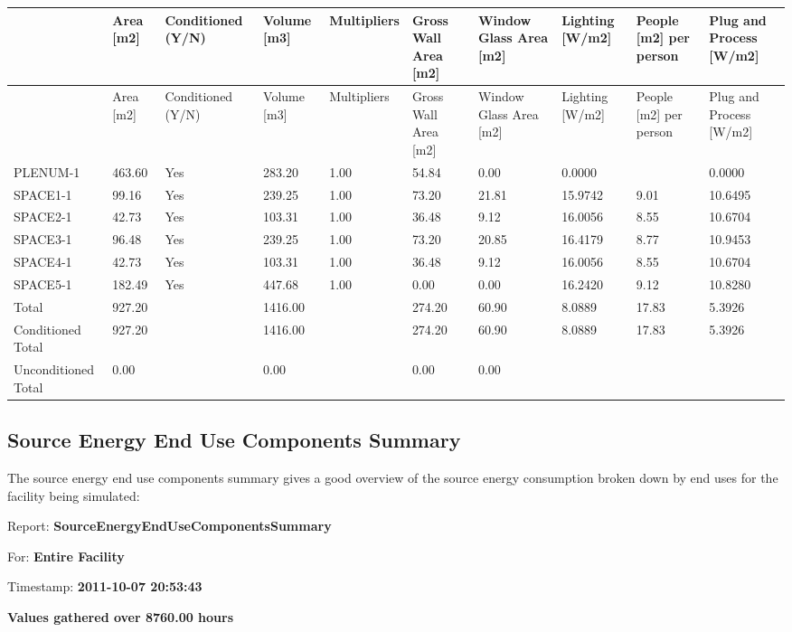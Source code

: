 {\scriptsize
\begin{longtable}[c]{>{\raggedright}p{0.7in}>{\raggedright}p{0.4in}>{\raggedright}p{0.5in}>{\raggedright}p{0.5in}>{\raggedright}p{0.4in}>{\raggedright}p{0.5in}>{\raggedright}p{0.5in}>{\raggedright}p{0.5in}>{\raggedright}p{0.5in}>{\raggedright}p{0.5in}}
\toprule
~ & Area [m2] & Conditioned (Y/N) & Volume [m3] & Multipliers & Gross Wall Area [m2] & Window Glass Area [m2] & Lighting [W/m2] & People [m2] per person & Plug and Process [W/m2] \tabularnewline
\midrule
\endfirsthead

\toprule
~ & Area [m2] & Conditioned (Y/N) & Volume [m3] & Multipliers & Gross Wall Area [m2] & Window Glass Area [m2] & Lighting [W/m2] & People [m2] per person & Plug and Process [W/m2] \tabularnewline
\midrule
\endhead

PLENUM-1 & 463.60 & Yes & 283.20 & 1.00 & 54.84 & 0.00 & 0.0000 & ~ & 0.0000 \tabularnewline
SPACE1-1 & 99.16 & Yes & 239.25 & 1.00 & 73.20 & 21.81 & 15.9742 & 9.01 & 10.6495 \tabularnewline
SPACE2-1 & 42.73 & Yes & 103.31 & 1.00 & 36.48 & 9.12 & 16.0056 & 8.55 & 10.6704 \tabularnewline
SPACE3-1 & 96.48 & Yes & 239.25 & 1.00 & 73.20 & 20.85 & 16.4179 & 8.77 & 10.9453 \tabularnewline
SPACE4-1 & 42.73 & Yes & 103.31 & 1.00 & 36.48 & 9.12 & 16.0056 & 8.55 & 10.6704 \tabularnewline
SPACE5-1 & 182.49 & Yes & 447.68 & 1.00 & 0.00 & 0.00 & 16.2420 & 9.12 & 10.8280 \tabularnewline
Total & 927.20 & ~ & 1416.00 & ~ & 274.20 & 60.90 & 8.0889 & 17.83 & 5.3926 \tabularnewline
Conditioned Total & 927.20 & ~ & 1416.00 & ~ & 274.20 & 60.90 & 8.0889 & 17.83 & 5.3926 \tabularnewline
Unconditioned Total & 0.00 & ~ & 0.00 & ~ & 0.00 & 0.00 & ~ & ~ & ~ \tabularnewline
\bottomrule
\end{longtable}}

\subsection{Source Energy End Use Components Summary}\label{source-energy-end-use-components-summary}

The source energy end use components summary gives a good overview of the source energy consumption broken down by end uses for the facility being simulated:

Report: \textbf{SourceEnergyEndUseComponentsSummary}

For: \textbf{Entire Facility}

Timestamp: \textbf{2011-10-07 20:53:43}

\textbf{Values gathered over 8760.00 hours}

